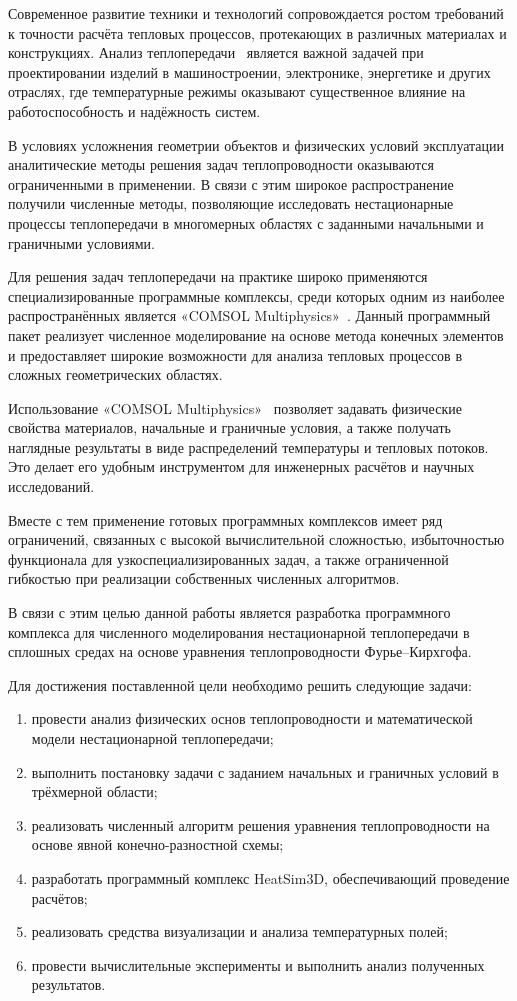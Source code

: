 \intro

Современное развитие техники и технологий сопровождается ростом требований к точности расчёта тепловых процессов, протекающих в различных материалах и конструкциях. Анализ теплопередачи~\cite{krainov2016} является важной задачей при проектировании изделий в машиностроении, электронике, энергетике и других отраслях, где температурные режимы оказывают существенное влияние на работоспособность и надёжность систем.

В условиях усложнения геометрии объектов и физических условий эксплуатации аналитические методы решения задач теплопроводности оказываются ограниченными в применении. В связи с этим широкое распространение получили численные методы, позволяющие исследовать нестационарные процессы теплопередачи в многомерных областях с заданными начальными и граничными условиями.

Для решения задач теплопередачи на практике широко применяются специализированные программные комплексы, среди которых одним из наиболее распространённых является «COMSOL Multiphysics»~\cite{vajdi2020review}. Данный программный пакет реализует численное моделирование на основе метода конечных элементов~\cite{розин2000метод} и предоставляет широкие возможности для анализа тепловых процессов в сложных геометрических областях.

Использование «COMSOL Multiphysics»~\cite{suarez2014study} позволяет задавать физические свойства материалов, начальные и граничные условия, а также получать наглядные результаты в виде распределений температуры и тепловых потоков. Это делает его удобным инструментом для инженерных расчётов и научных исследований.

Вместе с тем применение готовых программных комплексов имеет ряд ограничений, связанных с высокой вычислительной сложностью, избыточностью функционала для узкоспециализированных задач, а также ограниченной гибкостью при реализации собственных численных алгоритмов.

В связи с этим целью данной работы является разработка программного комплекса для численного моделирования нестационарной теплопередачи в сплошных средах на основе уравнения теплопроводности Фурье–Кирхгофа.

Для достижения поставленной цели необходимо решить следующие задачи:
\begin{enumerate}[label=\arabic*.]
    \item провести анализ физических основ теплопроводности и математической модели нестационарной теплопередачи;
    \item выполнить постановку задачи с заданием начальных и граничных условий в трёхмерной области;
    \item реализовать численный алгоритм решения уравнения теплопроводности на основе явной конечно-разностной схемы;
    \item разработать программный комплекс HeatSim3D, обеспечивающий проведение расчётов;
    \item реализовать средства визуализации и анализа температурных полей;
    \item провести вычислительные эксперименты и выполнить анализ полученных результатов.
\end{enumerate}

